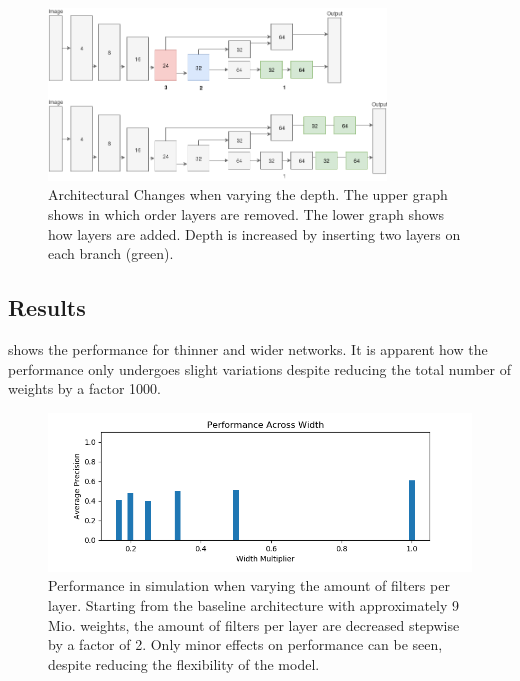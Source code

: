 		\begin{figure}[hbtp]
			\centering
			\includegraphics[width=0.8\textwidth]{fig/depth_changes}
			\caption{Architectural Changes when varying the depth. The upper graph shows in which order layers are removed. The lower graph shows how layers are added. Depth is increased by inserting two layers on each branch (green). }
			\label{fig:depth_changes}
		\end{figure}
	
	\subsection{Results}
	
	 shows the performance for thinner and wider networks. It is apparent how the performance only undergoes slight variations despite reducing the total number of weights by a factor 1000. 
	
	
	\begin{figure}[hbtp]
		\centering
		\includegraphics[width=\textwidth]{fig/perf_width}
		\caption{Performance in simulation when varying the amount of filters per layer. Starting from the baseline architecture with approximately 9 Mio. weights, the amount of filters per layer are decreased stepwise by a factor of 2. Only minor effects on performance can be seen, despite reducing the flexibility of the model.}
		\label{fig:perf_width}
	\end{figure}
	
